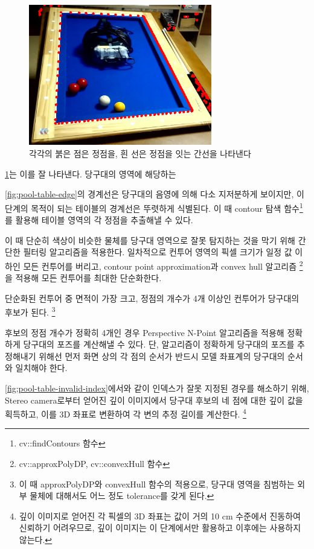 \documentclass[11pt]{oblivoir}
\begin{document}
    \begin{figure}[ht]
        \centering
        \includegraphics[width=8cm]{img/billiards-table-contours-dot-view.png}
        \caption{각각의 붉은 점은 정점을, 흰 선은 정점을 잇는 간선을 나타낸다}
        \label{fig;table-contour-dot-view}
    \end{figure}
    
    \cref{fig;table-contour-dot-view}는 이를 잘 나타낸다. 당구대의 영역에 해당하는 

    \cref{fig;pool-table-edge}의 경계선은 당구대의 음영에 의해 다소 지저분하게 보이지만, 이 단계의 목적이 되는 테이블의 경계선은 뚜렷하게 식별된다. 이 때 contour 탐색 함수\footnote{cv::findContours 함수}를 활용해 테이블 영역의 각 정점을 추출해낼 수 있다.

    이 때 단순히 색상이 비슷한 물체를 당구대 영역으로 잘못 탐지하는 것을 막기 위해 간단한 필터링 알고리즘을 적용한다. 일차적으로 컨투어 영역의 픽셀 크기가 일정 값 이하인 모든 컨투어를 버리고, contour point approximation과 convex hull 알고리즘
    \footnote{cv::approxPolyDP, cv::convexHull 함수}
    을 적용해 모든 컨투어를 최대한 단순화한다.

    단순화된 컨투어 중 면적이 가장 크고, 정점의 개수가 4개 이상인 컨투어가 당구대의 후보가 된다.
    \footnote{이 때 approxPolyDP와 convexHull 함수의 적용으로, 당구대 영역을 침범하는 외부 물체에 대해서도 어느 정도 tolerance를 갖게 된다.}

    후보의 정점 개수가 정확히 4개인 경우 Perspective N-Point 알고리즘을 적용해 정확하게 당구대의 포즈를 계산해낼 수 있다. 단, 알고리즘이 정확하게 당구대의 포즈를 추정해내기 위해선 먼저 화면 상의 각 점의 순서가 반드시 모델 좌표계의 당구대의 순서와 일치해야 한다.

    \cref{fig;pool-table-invalid-index}에서와 같이 인덱스가 잘못 지정된 경우를 해소하기 위해, Stereo camera로부터 얻어진 깊이 이미지에서 당구대 후보의 네 점에 대한 깊이 값을 획득하고, 이를 3D 좌표로 변환하여 각 변의 추정 길이를 계산한다.
    \footnote{깊이 이미지로 얻어진 각 픽셀의 3D 좌표는 값이 거의 10 cm 수준에서 진동하여 신뢰하기 어려우므로, 깊이 이미지는 이 단계에서만 활용하고 이후에는 사용하지 않는다.}
\end{document}
